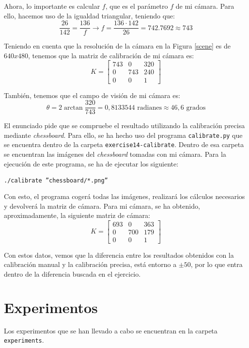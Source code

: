 \documentclass[a4paper,10pt,titlepage,oneside,openright]{book}
\begin{document}
Ahora, lo importante es calcular $f$, que es el parámetro $f$ de mi cámara. Para ello, hacemos uso de la igualdad triangular, teniendo que:
$$\frac{26}{142} = \frac{136}{f} \rightarrow f = \frac{136\cdot142}{26} = 742.7692 \approx 743$$

Teniendo en cuenta que la resolución de la cámara en la Figura \ref{scene} es de $640x480$, tenemos que la matriz de calibración de mi cámara es:
$$K = \left[ 
\begin{array}{ccc}
 743 & 0 & 320 \\
 0 & 743 & 240 \\
 0 & 0 & 1
\end{array} 
\right]
$$

También, tenemos que el campo de visión de mi cámara es:
$$\theta = 2 \arctan \frac{320}{743} = 0,8133544 \mbox{ radianes} \approx 46,6 \mbox{ grados}$$

El enunciado pide que se compruebe el resultado utilizando la calibración precisa mediante \textit{chessboard}. Para ello, se ha hecho uso del programa \texttt{calibrate.py} que se encuentra dentro de la carpeta \texttt{exercise14-calibrate}. Dentro de esa carpeta se encuentran las imágenes del \textit{chessboard} tomadas con mi cámara. Para la ejecución de este programa, se ha de ejecutar los siguiente:
\begin{center}
 \texttt{./calibrate ''chessboard/*.png''}
\end{center}
Con esto, el programa cogerá todas las imágenes, realizará los cálculos necesarios y devolverá la matriz de cámara. Para mi cámara, se ha obtenido, aproximadamente, la siguiente matriz de cámara:
$$K = \left[ 
\begin{array}{ccc}
 693 & 0 & 363 \\
 0 & 700 & 179 \\
 0 & 0 & 1
\end{array} 
\right]
$$

Con estos datos, vemos que la diferencia entre los resultados obtenidos con la calibración manual y la calibración precisa, está entorno a $\pm50$, por lo que entra dentro de la diferencia buscada en el ejercicio. 



\medskip
\section{Experimentos}
Los experimentos que se han llevado a cabo se encuentran en la carpeta \texttt{experiments}.
\end{document}
